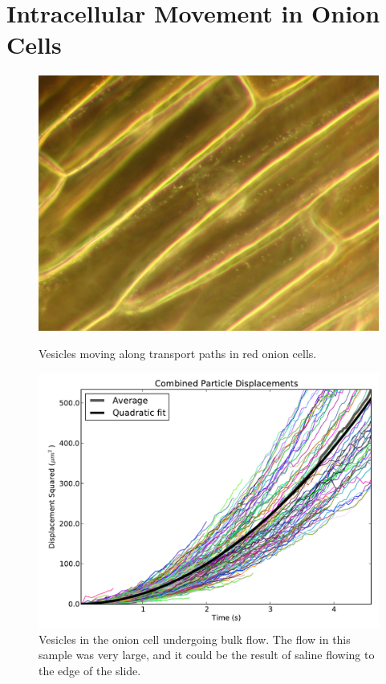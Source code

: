 \documentclass[11pt,letterpaper]{article}
\begin{document}
\ \\

\section{Intracellular Movement in Onion Cells}

\begin{figure}
    \centering
    \begin{minipage}[t]{0.485\textwidth}
        \centering
        \includegraphics[width=\textwidth]{figures/IMG_0049.JPG}
        \caption{Vesicles moving along transport paths in red onion cells.}
        \label{onionphoto}
    \end{minipage}
    \begin{minipage}[t]{0.485\textwidth}
        \centering
        \includegraphics[width=\textwidth]{figures/bulk_onion.pdf}
        \caption{Vesicles in the onion cell undergoing bulk flow. The flow in
        this sample was very large, and it could be the result of saline flowing
        to the edge of the slide.}
        \label{bulk_onion}
    \end{minipage}
\end{figure}
\end{document}
